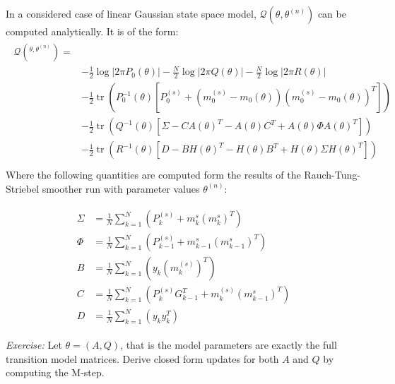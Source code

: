 \documentclass{tufte-handout}
\begin{document}
In a considered case of linear Gaussian state space model, $\mathcal{Q}(\theta, \theta^{(n)})$ can be computed analytically. 
It is of the form: 
    \begin{multline}
        \begin{aligned}
        \mathcal{Q}(^{\theta, \theta^{(n)}}) = \\ 
        & -\frac{1}{2} \log|2\pi P_0(\theta)| - \frac{N}{2} \log|2\pi Q(\theta)| - \frac{N}{2} \log|2\pi R(\theta)| \\
        & - \frac{1}{2} \operatorname{tr} \left( P_0^{-1}(\theta) \left[ P_0^{(s)} + (m_0^{(s)} - m_0(\theta))(m_0^{(s)} - m_0(\theta))^T \right] \right) \\ 
        & - \frac{1}{2} \operatorname{tr} \left( Q^{-1}(\theta) \left[  \Sigma -  CA(\theta)^T - A(\theta) C^T + A(\theta) \Phi A(\theta)^T \right] \right) \\ 
        & - \frac{1}{2} \operatorname{tr} \left( R^{-1}(\theta) \left[  D-  BH(\theta)^T - H(\theta) B^T + H(\theta) \Sigma H(\theta)^T \right] \right) \\ 
        \end{aligned}
    \end{multline}
Where the following quantities are computed form the results of the Rauch-Tung-Striebel smoother run with parameter values $\theta^{(n)}$:

\begin{multline*}
    \begin{aligned}
        \Sigma & = \frac{1}{N} \sum_{k=1}^N \left( P_k^{(s)} + m_k^{s} (m_{k}^{s})^T \right)   \\
        \Phi & = \frac{1}{N} \sum_{k=1}^N \left(P_{k-1}^{(s)} + m_{k-1}^{s} (m_{k-1}^{s})^T \right) \\
        B & = \frac{1}{N} \sum_{k=1}^N \left( y_k (m_{k}^{(s)})^T \right)\\
        C &= \frac{1}{N} \sum_{k=1}^{N} \left( P_k^{(s)} G_{k-1}^T + m_k^{(s)} (m_{k-1}^{s})^T \right) \\
        D &= \frac{1}{N} \sum_{k=1}^{N} \left( y_k y_{k}^T \right) 
    \end{aligned}
\end{multline*}

\emph{Exercise:} Let $\theta = (A, Q)$, that is the model parameters are exactly the full 
transition model matrices. Derive closed form updates for both $A$ and $Q$ by computing the M-step.
\end{document}
